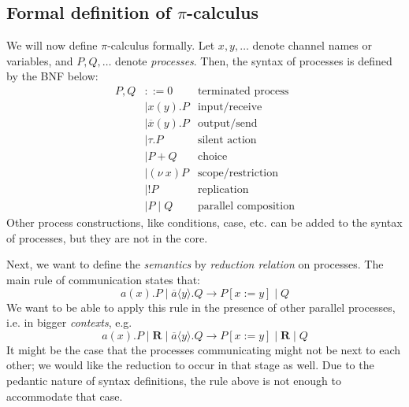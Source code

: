 \documentclass[a4paper, openany]{memoir}
\theoremstyle{definition}
\begin{document}
    \subsection{Formal definition of $\pi$-calculus}
    We will now define $\pi$-calculus formally. Let $x, y, \dots$ denote channel names or variables, and $P, Q, \dots$ denote \emph{processes}. Then, the syntax of processes is defined by the BNF below:
    \begin{align*}
        P, Q &::= 0 & \textrm{terminated process} \\
        &\mid x(y).P & \textrm{input/receive} \\
        &\mid \overline{x}(y).P & \textrm{output/send} \\
        &\mid \tau.P & \textrm{silent action} \\
        &\mid P + Q & \textrm{choice} \\
        &\mid (\nu \ x) P & \textrm{scope/restriction} \\
        &\mid !P & \textrm{replication} \\
        &\mid P \mid Q & \textrm{parallel composition}
    \end{align*}
    Other process constructions, like conditions, case, etc. can be added to the syntax of processes, but they are not in the core.

    Next, we want to define the \emph{semantics} by \emph{reduction relation} on processes. The main rule of communication states that:
    \[a(x).P \mid \overline{a} \langle y \rangle.Q \to P[x := y] \mid Q\]
    We want to be able to apply this rule in the presence of other parallel processes, i.e. in bigger \emph{contexts}, e.g.
    \[a(x).P \mid \textbf{R} \mid \overline{a} \langle y \rangle.Q \to P[x := y] \mid \textbf{R} \mid Q\]
    It might be the case that the processes communicating might not be next to each other; we would like the reduction to occur in that stage as well. Due to the pedantic nature of syntax definitions, the rule above is not enough to accommodate that case.
\end{document}
